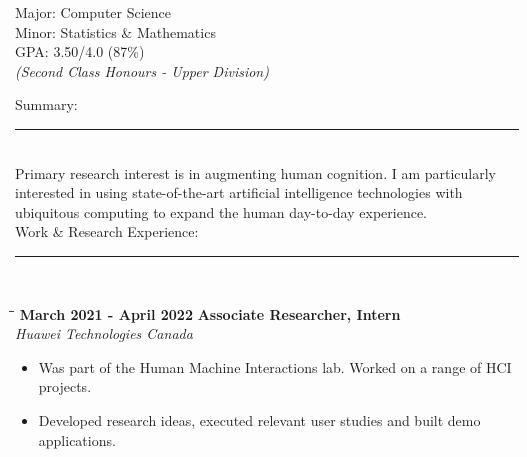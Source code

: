 \documentclass[a4paper,10pt]{article}
\begin{document}
{\begin{minipage}[t]{0.33\textwidth}
\begin{tabbing}
      \> \>  \> {\small Major: Computer Science} \\
      \> \>  \> {\small Minor: Statistics \& Mathematics} \\
      \> \>  \> {\small GPA: 3.50/4.0 (87\%)}\\
      \> \>  \> {\small \emph{(Second Class Honours - Upper Division)}}
    \end{tabbing}
  \end{minipage}
  \hspace{20pt}
  \begin{minipage}[t]{0.60\textwidth}
    \color{black!80}
    \small
    {\large Summary:}\vspace{-0.2cm}\\
    \rule{0.75\textwidth}{0.4pt}
    \vspace{0.1cm}\\
    {\small Primary research interest is in augmenting human cognition. I
    am particularly interested in using state-of-the-art artificial
    intelligence technologies with ubiquitous computing to expand the
    human day-to-day experience. }
    \vspace{0.5cm}\\
    {\large Work \& Research Experience:}\vspace{-0.2cm}\\
    \rule{0.75\textwidth}{0.4pt}
    \vspace{-0.6cm}\\
    \begin{tabbing}
      \=\hspace*{6cm}\=\hspace*{5cm}\= \kill
      \>\textbf{ March 2021 - April 2022} \> \textbf{Associate Researcher, Intern}\\\>\> \emph{Huawei Technologies Canada}
    \end{tabbing}
    \vspace{-0.4cm}
    \begin{itemize}
      \setlength\itemsep{-0.1pt}
    \item Was part of the Human Machine Interactions lab. Worked on a range of HCI projects.
    \item Developed research ideas, executed relevant user studies and built demo applications.
    \end{itemize}

\end{minipage}}
\end{document}
